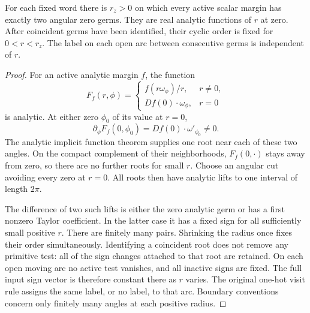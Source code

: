 \begin{lemma}
\label{lem:v68-root-order}
For each fixed word there is $r_z>0$ on which every active scalar
margin has exactly two angular zero germs. They are real analytic
functions of $r$ at zero. After coincident germs have been identified,
their cyclic order is fixed for $0<r<r_z$. The label on each open
arc between consecutive germs is independent of $r$.
\end{lemma}
\begin{proof}
For an active analytic margin $f$, the function
\[
 F_f(r,\phi)=\begin{cases}f(r\omega_\phi)/r,&r\ne0,\\
                           Df(0)\cdot\omega_\phi,&r=0
              \end{cases}
\]
is analytic. At either zero $\phi_0$ of its value at $r=0$,
\[
 \partial_\phi F_f(0,\phi_0)=Df(0)\cdot\omega'_{\phi_0}\ne0.
\]
The analytic implicit function theorem supplies one root near each
of these two angles. On the compact complement of their neighborhoods,
$F_f(0,\cdot)$ stays away from zero, so there are no further roots
for small $r$. Choose an angular cut avoiding every zero at $r=0$.
All roots then have analytic lifts to one interval of length $2\pi$.

The difference of two such lifts is either the zero analytic germ or
has a first nonzero Taylor coefficient. In the latter case it has a
fixed sign for all sufficiently small positive $r$. There are finitely
many pairs. Shrinking the radius once fixes their order simultaneously.
Identifying a coincident root does not remove any primitive test: all
of the sign changes attached to that root are retained. On each open
moving arc no active test vanishes, and all inactive signs are fixed.
The full input sign vector is therefore constant there as $r$ varies.
The original one-hot visit rule assigns the same label, or no label,
to that arc. Boundary conventions concern only finitely many angles
at each positive radius.
\end{proof}

